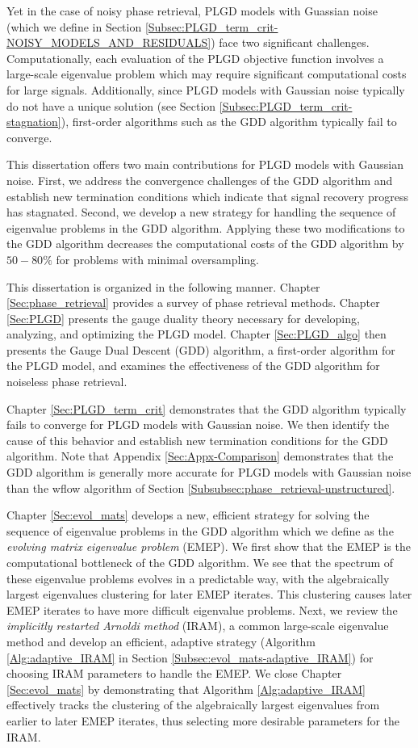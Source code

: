 Yet in the case of noisy phase retrieval, PLGD models with Guassian noise (which we define in Section  \ref{Subsec:PLGD_term_crit-NOISY_MODELS_AND_RESIDUALS}) face two significant challenges.  
Computationally, each evaluation of the PLGD objective function involves a large-scale eigenvalue problem which may require significant computational costs for large signals.  
Additionally, since PLGD models with Gaussian noise typically do not have a unique solution (see Section \ref{Subsec:PLGD_term_crit-stagnation}), first-order algorithms such as the GDD algorithm typically fail to converge.


This dissertation offers two main contributions for PLGD models with Gaussian noise.  
First, we address the convergence challenges of the GDD algorithm and establish new termination conditions which indicate that signal recovery progress has stagnated.  
Second, we develop a new strategy for handling the sequence of eigenvalue problems in the GDD algorithm.
Applying these two modifications to the GDD algorithm decreases the computational costs of the GDD algorithm by $50-80\%$ for problems with minimal oversampling.


This dissertation is organized in the following manner.  
Chapter \ref{Sec:phase_retrieval} provides a survey of phase retrieval methods.  
Chapter \ref{Sec:PLGD} presents the gauge duality theory necessary for developing, analyzing, and optimizing the PLGD model.
Chapter \ref{Sec:PLGD_algo} then presents the Gauge Dual Descent (GDD) algorithm, a first-order algorithm for the PLGD model, and examines the effectiveness of the GDD algorithm for noiseless phase retrieval.


Chapter \ref{Sec:PLGD_term_crit} demonstrates that the GDD algorithm typically fails to converge for PLGD models with Gaussian noise.
We then identify the cause of this behavior and establish new termination conditions for the GDD algorithm.
Note that Appendix \ref{Sec:Appx-Comparison} demonstrates that the GDD algorithm is generally more accurate for PLGD models with Gaussian noise than the wflow algorithm of Section \ref{Subsubsec:phase_retrieval-unstructured}.


Chapter \ref{Sec:evol_mats} develops a new, efficient strategy for solving the sequence of eigenvalue problems in the GDD algorithm which we define as the \textit{evolving matrix eigenvalue problem} (EMEP).
We first show that the EMEP is the computational bottleneck of the GDD algorithm.
We see that the spectrum of these eigenvalue problems evolves in a predictable way, with the algebraically largest eigenvalues clustering for later EMEP iterates.
This clustering causes later EMEP iterates to have more difficult eigenvalue problems.
Next, we review the \textit{implicitly restarted Arnoldi method} (IRAM), a common large-scale eigenvalue method and develop an efficient, adaptive strategy (Algorithm \ref{Alg:adaptive_IRAM} in Section \ref{Subsec:evol_mats-adaptive_IRAM}) for choosing IRAM parameters to handle the EMEP.
We close Chapter \ref{Sec:evol_mats} by demonstrating that Algorithm \ref{Alg:adaptive_IRAM} effectively tracks the clustering of the algebraically largest eigenvalues from earlier to later EMEP iterates, thus selecting more desirable parameters for the IRAM.



